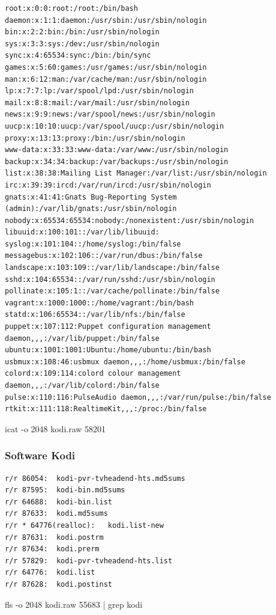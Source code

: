 \begin{cmd}[H]
\begin{verbatim}
root:x:0:0:root:/root:/bin/bash
daemon:x:1:1:daemon:/usr/sbin:/usr/sbin/nologin
bin:x:2:2:bin:/bin:/usr/sbin/nologin
sys:x:3:3:sys:/dev:/usr/sbin/nologin
sync:x:4:65534:sync:/bin:/bin/sync
games:x:5:60:games:/usr/games:/usr/sbin/nologin
man:x:6:12:man:/var/cache/man:/usr/sbin/nologin
lp:x:7:7:lp:/var/spool/lpd:/usr/sbin/nologin
mail:x:8:8:mail:/var/mail:/usr/sbin/nologin
news:x:9:9:news:/var/spool/news:/usr/sbin/nologin
uucp:x:10:10:uucp:/var/spool/uucp:/usr/sbin/nologin
proxy:x:13:13:proxy:/bin:/usr/sbin/nologin
www-data:x:33:33:www-data:/var/www:/usr/sbin/nologin
backup:x:34:34:backup:/var/backups:/usr/sbin/nologin
list:x:38:38:Mailing List Manager:/var/list:/usr/sbin/nologin
irc:x:39:39:ircd:/var/run/ircd:/usr/sbin/nologin
gnats:x:41:41:Gnats Bug-Reporting System (admin):/var/lib/gnats:/usr/sbin/nologin
nobody:x:65534:65534:nobody:/nonexistent:/usr/sbin/nologin
libuuid:x:100:101::/var/lib/libuuid:
syslog:x:101:104::/home/syslog:/bin/false
messagebus:x:102:106::/var/run/dbus:/bin/false
landscape:x:103:109::/var/lib/landscape:/bin/false
sshd:x:104:65534::/var/run/sshd:/usr/sbin/nologin
pollinate:x:105:1::/var/cache/pollinate:/bin/false
vagrant:x:1000:1000::/home/vagrant:/bin/bash
statd:x:106:65534::/var/lib/nfs:/bin/false
puppet:x:107:112:Puppet configuration management daemon,,,:/var/lib/puppet:/bin/false
ubuntu:x:1001:1001:Ubuntu:/home/ubuntu:/bin/bash
usbmux:x:108:46:usbmux daemon,,,:/home/usbmux:/bin/false
colord:x:109:114:colord colour management daemon,,,:/var/lib/colord:/bin/false
pulse:x:110:116:PulseAudio daemon,,,:/var/run/pulse:/bin/false
rtkit:x:111:118:RealtimeKit,,,:/proc:/bin/false
\end{verbatim}
\caption{icat -o 2048 kodi.raw 58201}
\label{cmd:kodi-passwd}
\end{cmd}

\subsubsection{Software Kodi}

\begin{cmd}[H]
\begin{verbatim}
r/r 86054:	kodi-pvr-tvheadend-hts.md5sums
r/r 87595:	kodi-bin.md5sums
r/r 64688:	kodi-bin.list
r/r 87633:	kodi.md5sums
r/r * 64776(realloc):	kodi.list-new
r/r 87631:	kodi.postrm
r/r 87634:	kodi.prerm
r/r 57829:	kodi-pvr-tvheadend-hts.list
r/r 64776:	kodi.list
r/r 87628:	kodi.postinst
\end{verbatim}
\caption{fls -o 2048 kodi.raw 55683 | grep kodi}
\label{cmd:kodi-dpkgkodi}
\end{cmd}

